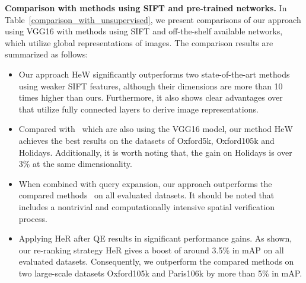 \documentclass[journal]{IEEEtran}
\begin{document}
\vspace{0.01in}
\textbf{Comparison with methods using SIFT and pre-trained networks.}
In Table~\ref{comparison_with_unsupervised}, we present comparisons of our approach using VGG16 with methods using SIFT and off-the-shelf available networks, which utilize global representations of images. The comparison results are summarized as follows:
\begin{itemize}
  \item Our approach HeW significantly outperforms two state-of-the-art methods~\cite{do2017embedding,murray2017interferences} using weaker SIFT features, although their dimensions are more than 10 times higher than ours.
  Furthermore, it also shows clear advantages over~\cite{gong2014multi,babenko2014neural,razavian2014cnn} that utilize fully connected layers to derive image representations.
  \item Compared with~\cite{tolias2016particular,kalantidis2016cross,hoang2017selective,xu2018unsupervised,pang2018building} which are also using the VGG16 model, our method HeW achieves the best results on the datasets of Oxford5k, Oxford105k and Holidays. Additionally, it is worth noting that, the gain on Holidays is over 3\% at the same dimensionality.
  \item When combined with query expansion, our approach outperforms the compared methods~\cite{tolias2016particular,kalantidis2016cross,xu2018unsupervised,pang2018building} on all evaluated datasets. It should be noted that~\cite{tolias2016particular} includes a nontrivial and computationally intensive spatial verification process.
  \item Applying HeR after QE results in significant performance gains. As shown, our re-ranking strategy HeR gives a boost of around 3.5\% in mAP on all evaluated datasets. Consequently, we outperform the compared methods on two large-scale datasets Oxford105k and Paris106k by more than 5\% in mAP.
\end{itemize}
\end{document}
